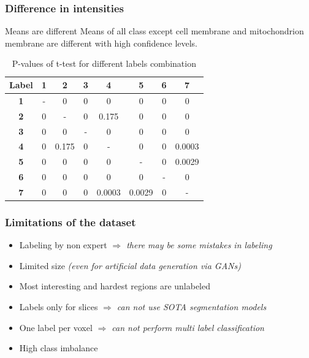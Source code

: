 \documentclass{beamer}
\begin{document}
\begin{frame}
    \frametitle{Difference in intensities}
    \begin{block}{Means are different}
        Means of all class except cell membrane and mitochondrion membrane are
        different with high confidence levels.
    \end{block}
    \begin{table}[ht]
        \centering
        \begin{tabular}{|c|c|c|c|c|c|c|c| }
            \hline
            Label      & \textbf{1} & \textbf{2} & \textbf{3} & \textbf{4} & \textbf{5} & \textbf{6} & \textbf{7} \\
            \hline
            \textbf{1} & -          & 0          & 0          & 0          & 0          & 0          & 0          \\
            \hline
            \textbf{2} & 0          & -          & 0          & 0.175      & 0          & 0          & 0          \\
            \hline
            \textbf{3} & 0          & 0          & -          & 0          & 0          & 0          & 0          \\
            \hline
            \textbf{4} & 0          & 0.175      & 0          & -          & 0          & 0          & 0.0003     \\
            \hline
            \textbf{5} & 0          & 0          & 0          & 0          & -          & 0          & 0.0029     \\
            \hline
            \textbf{6} & 0          & 0          & 0          & 0          & 0          & -          & 0          \\
            \hline
            \textbf{7} & 0          & 0          & 0          & 0.0003     & 0.0029     & 0          & -          \\
            \hline
        \end{tabular}
        \caption{P-values of t-test for different labels combination}
        \label{tab:data_ttest}
    \end{table}
\end{frame}

\begin{frame}
    \frametitle{Limitations of the dataset}
    \begin{itemize}
        \item Labeling by non expert \textit{\( \Rightarrow \) there may be some mistakes in labeling}
        \item Limited size \textit{(even for artificial data generation via GANs)}
        \item Most interesting and hardest regions are unlabeled
        \item Labels only for slices \textit{\( \Rightarrow \) can not use SOTA segmentation models}
        \item One label per voxel \textit{\( \Rightarrow \) can not perform multi label classification}
        \item High class imbalance
    \end{itemize}
\end{frame}
\end{document}
